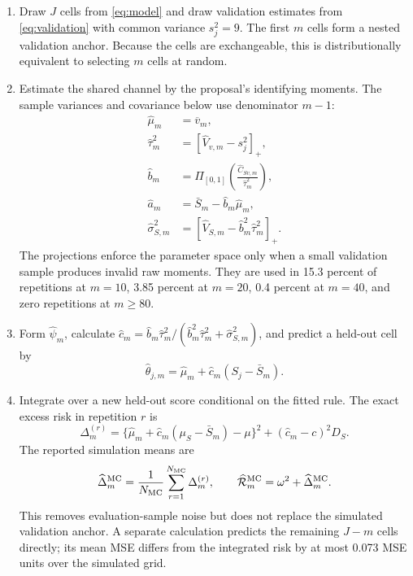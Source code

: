 \documentclass[11pt]{article}
\begin{document}
\begin{enumerate}[label=\arabic*.,leftmargin=2.2em]
 \item Draw \(J\) cells from \eqref{eq:model} and draw validation estimates
 from \eqref{eq:validation} with common variance \(s_j^2=9\). The first
 \(m\) cells form a nested validation anchor. Because the cells are
 exchangeable, this is distributionally equivalent to selecting \(m\) cells
 at random.

 \item Estimate the shared channel by the proposal's identifying moments.
 The sample variances and covariance below use denominator \(m-1\):
 \begin{align}
  \widehat\mu_m
  &=\overline v_m, \\
  \widehat\tau_m^2
  &=[\widehat V_{v,m}-s_j^2]_+, \\
  \widehat b_m
  &=\Pi_{[0,1]}
    \left(\frac{\widehat C_{Sv,m}}{\widehat\tau_m^2}\right), \\
  \widehat a_m
  &=\bar S_m-\widehat b_m\widehat\mu_m, \\
  \widehat\sigma_{S,m}^2
  &=[\widehat V_{S,m}-\widehat b_m^2\widehat\tau_m^2]_+.
  \label{eq:simulation-moments}
 \end{align}
 The projections enforce the parameter space only when a small validation
 sample produces invalid raw moments. They are used in 15.3 percent of
 repetitions at \(m=10\), 3.85 percent at \(m=20\), 0.4 percent at
 \(m=40\), and zero repetitions at \(m\geq80\).

 \item Form \(\widehat\psi_m\), calculate
 \(\widehat c_m=\widehat b_m\widehat\tau_m^2/
 (\widehat b_m^2\widehat\tau_m^2+\widehat\sigma_{S,m}^2)\), and predict a
 held-out cell by
 \begin{equation}
  \widehat\theta_{j,m}
  =\widehat\mu_m+\widehat c_m(S_j-\bar S_m).
  \label{eq:simulation-predictor}
 \end{equation}

 \item Integrate over a new held-out score conditional on the fitted rule.
 The exact excess risk in repetition \(r\) is
 \begin{equation}
 \Delta_m^{(r)}
  =\{\widehat\mu_m+\widehat c_m(\mu_S-\bar S_m)-\mu\}^2
   +(\widehat c_m-c)^2D_S.
 \label{eq:integrated-excess}
 \end{equation}
 The reported simulation means are
 \begin{equation}
  \widehat\Delta_m^{\rm MC}
  =\frac1{N_{\rm MC}}\sum_{r=1}^{N_{\rm MC}}\Delta_m^{(r)},
  \qquad
  \widehat{\mathcal R}_m^{\rm MC}
  =\omega^2+\widehat\Delta_m^{\rm MC}.
  \label{eq:mc-risk-means}
 \end{equation}
 This removes evaluation-sample noise but does not replace the simulated
 validation anchor. A separate calculation predicts the remaining
 \(J-m\) cells directly; its mean MSE differs from the integrated risk by at
 most 0.073 MSE units over the simulated grid.


\end{enumerate}
\end{document}
